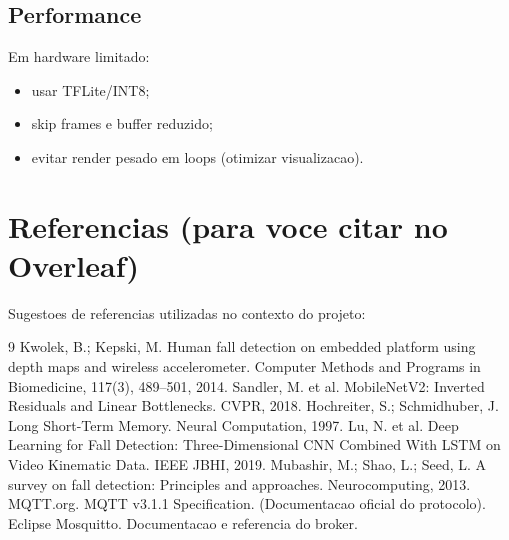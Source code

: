 \subsection{Performance}
Em hardware limitado:
\begin{itemize}
  \item usar TFLite/INT8;
  \item skip frames e buffer reduzido;
  \item evitar render pesado em loops (otimizar visualizacao).
\end{itemize}

\section{Referencias (para voce citar no Overleaf)}
Sugestoes de referencias utilizadas no contexto do projeto:
\begin{thebibliography}{9}
   Kwolek, B.; Kepski, M. Human fall detection on embedded platform using depth maps and wireless accelerometer. Computer Methods and Programs in Biomedicine, 117(3), 489--501, 2014.
   Sandler, M. et al. MobileNetV2: Inverted Residuals and Linear Bottlenecks. CVPR, 2018.
   Hochreiter, S.; Schmidhuber, J. Long Short-Term Memory. Neural Computation, 1997.
   Lu, N. et al. Deep Learning for Fall Detection: Three-Dimensional CNN Combined With LSTM on Video Kinematic Data. IEEE JBHI, 2019.
   Mubashir, M.; Shao, L.; Seed, L. A survey on fall detection: Principles and approaches. Neurocomputing, 2013.
   MQTT.org. MQTT v3.1.1 Specification. (Documentacao oficial do protocolo).
   Eclipse Mosquitto. Documentacao e referencia do broker.
\end{thebibliography}

